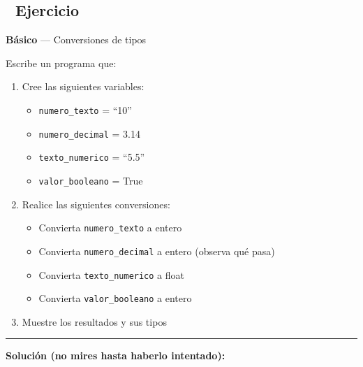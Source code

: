 \documentclass[
  doc,
  floatsintext,
  longtable,
  a4paper,
  nolmodern,
  notxfonts,
  notimes,
  12pt,
  colorlinks=true,linkcolor=blue,citecolor=blue,urlcolor=blue]{apa7}
\providecommand{\tightlist}{%
  \setlength{\itemsep}{0pt}\setlength{\parskip}{0pt}}
\begin{document}
\subsection{📝 Ejercicio}\label{ejercicio}

\textbf{Básico} --- Conversiones de tipos

Escribe un programa que:

\begin{enumerate}
\def\labelenumi{\arabic{enumi}.}
\tightlist
\item
  Cree las siguientes variables:

  \begin{itemize}
  \tightlist
  \item
    \texttt{numero\_texto} = ``10''
  \item
    \texttt{numero\_decimal} = 3.14
  \item
    \texttt{texto\_numerico} = ``5.5''
  \item
    \texttt{valor\_booleano} = True
  \end{itemize}
\item
  Realice las siguientes conversiones:

  \begin{itemize}
  \tightlist
  \item
    Convierta \texttt{numero\_texto} a entero
  \item
    Convierta \texttt{numero\_decimal} a entero (observa qué pasa)
  \item
    Convierta \texttt{texto\_numerico} a float
  \item
    Convierta \texttt{valor\_booleano} a entero
  \end{itemize}
\item
  Muestre los resultados y sus tipos
\end{enumerate}

\begin{center}\rule{0.5\linewidth}{0.5pt}\end{center}

\textbf{Solución (no mires hasta haberlo intentado):}
\end{document}
